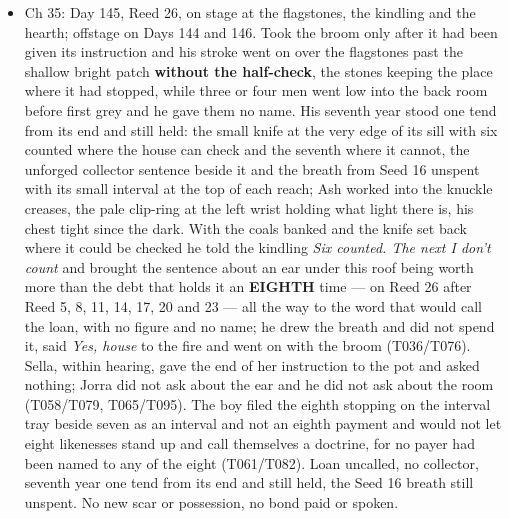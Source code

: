 \documentclass{design/chronicle}
\begin{document}
{\begin{itemize}[leftmargin=1.4em,itemsep=1pt,topsep=3pt,parsep=0pt]
\item Ch 35: Day 145, Reed 26, on stage at the flagstones, the kindling and the hearth; offstage on Days 144 and 146. Took the broom only after it had been given its instruction and his stroke went on over the flagstones past the shallow bright patch \textbf{without the half-check}, the stones keeping the place where it had stopped, while three or four men went low into the back room before first grey and he gave them no name. His seventh year stood one tend from its end and still held: the small knife at the very edge of its sill with six counted where the house can check and the seventh where it cannot, the unforged collector sentence beside it and the breath from Seed 16 unspent with its small interval at the top of each reach; Ash worked into the knuckle creases, the pale clip-ring at the left wrist holding what light there is, his chest tight since the dark. With the coals banked and the knife set back where it could be checked he told the kindling \emph{Six counted. The next I don’t count} and brought the sentence about an ear under this roof being worth more than the debt that holds it an \textbf{EIGHTH} time — on Reed 26 after Reed 5, 8, 11, 14, 17, 20 and 23 — all the way to the word that would call the loan, with no figure and no name; he drew the breath and did not spend it, said \emph{Yes, house} to the fire and went on with the broom (T036/T076). Sella, within hearing, gave the end of her instruction to the pot and asked nothing; Jorra did not ask about the ear and he did not ask about the room (T058/T079, T065/T095). The boy filed the eighth stopping on the interval tray beside seven as an interval and not an eighth payment and would not let eight likenesses stand up and call themselves a doctrine, for no payer had been named to any of the eight (T061/T082). Loan uncalled, no collector, seventh year one tend from its end and still held, the Seed 16 breath still unspent. No new scar or possession, no bond paid or spoken.

\end{itemize}

\begin{itemize}[leftmargin=1.4em,itemsep=1pt,topsep=3pt,parsep=0pt]


\end{itemize}}
\end{document}
